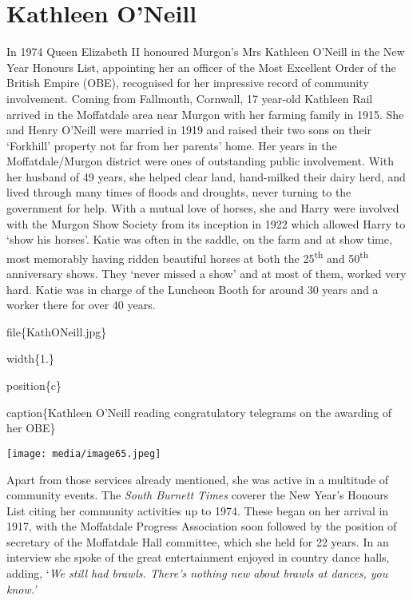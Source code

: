 \hypertarget{kathleen-oneill}{%
\section{Kathleen O'Neill}\label{kathleen-oneill}}

In 1974 Queen Elizabeth II honoured Murgon's Mrs Kathleen O'Neill in the New Year Honours List, appointing her an officer of the Most Excellent Order of the British Empire (OBE), recognised for her impressive record of community involvement. Coming from Fallmouth, Cornwall, 17 year-old Kathleen Rail arrived in the Moffatdale area near Murgon with her farming family in 1915. She and Henry O'Neill were married in 1919 and raised their two sons on their `Forkhill' property not far from her parents' home. Her years in the Moffatdale/Murgon district were ones of outstanding public involvement. With her husband of 49 years, she helped clear land, hand-milked their dairy herd, and lived through many times of floods and droughts, never turning to the government for help. With a mutual love of horses, she and Harry were involved with the Murgon Show Society from its inception in 1922 which allowed Harry to `show his horses'. Katie was often in the saddle, on the farm and at show time, most memorably having ridden beautiful horses at both the 25\textsuperscript{th} and 50\textsuperscript{th} anniversary shows. They `never missed a show' and at most of them, worked very hard. Katie was in charge of the Luncheon Booth for around 30 years and a worker there for over 40 years.

file\{KathONeill.jpg\}

width\{1.\}

position\{c\}

caption\{Kathleen O'Neill reading congratulatory telegrams on the awarding of her OBE\}

\texttt{[image: media/image65.jpeg]}

Apart from those services already mentioned, she was active in a multitude of community events. The \emph{South Burnett Times} coverer the New Year's Honours List citing her community activities up to 1974. These began on her arrival in 1917, with the Moffatdale Progress Association soon followed by the position of secretary of the Moffatdale Hall committee, which she held for 22 years. In an interview she spoke of the great entertainment enjoyed in country dance halls, adding, `\emph{We still had brawls. There's nothing new about brawls at dances, you know.'}

